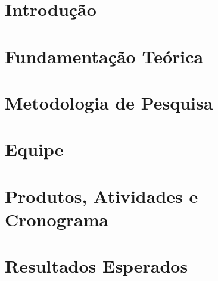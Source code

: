 \section{Introdução} %
\label{sec:introdu_o}
 

\section{Fundamentação Teórica} %
\label{sec:fundamentacao}
 

\section{Metodologia de Pesquisa} %
\label{sec:metodologia}
 

\section{Equipe} %
\label{sec:equipe}
 

\section{Produtos, Atividades e Cronograma} %
\label{sec:produtos}
 

\section{Resultados Esperados} %
\label{sec:resultados_esperados}
 
